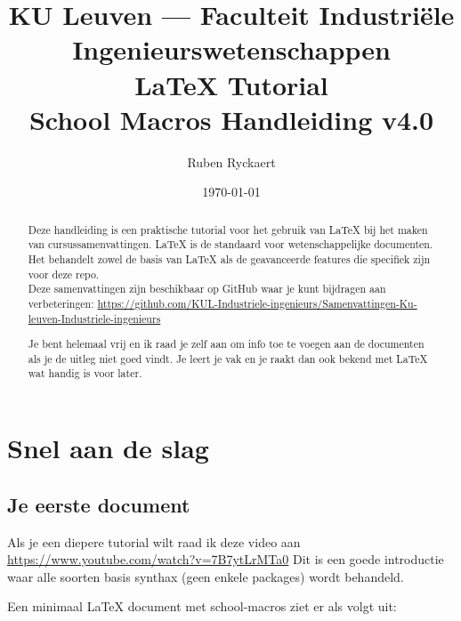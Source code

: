 \documentclass[a4paper,11pt]{article}
\title{%
    \vspace{-1cm}
    {\Large KU Leuven --- Faculteit Industriële Ingenieurswetenschappen}\\[0.5cm]
    {\Huge\bfseries LaTeX Tutorial}\\[0.3cm]
    {\Large School Macros Handleiding v4.0}
}
\author{Ruben Ryckaert}
\date{\today}
\begin{document}
\maketitle

\begin{abstract}
Deze handleiding is een praktische tutorial voor het gebruik van LaTeX bij het maken van
cursussamenvattingen. LaTeX is de standaard voor wetenschappelijke documenten.
Het behandelt zowel de basis van LaTeX als de geavanceerde features
die specifiek zijn voor deze repo.\\

Deze samenvattingen zijn beschikbaar op GitHub waar je kunt bijdragen aan verbeteringen: 
\url{https://github.com/KUL-Industriele-ingenieurs/Samenvattingen-Ku-leuven-Industriele-ingenieurs}

Je bent helemaal vrij en ik raad je zelf aan om info toe te voegen aan de documenten als je de uitleg niet goed vindt.
Je leert je vak en je raakt dan ook bekend met LaTeX wat handig is voor later.
\end{abstract}

\tableofcontents
\newpage


\section{Snel aan de slag}

\subsection{Je eerste document}

Als je een diepere tutorial wilt raad ik deze video aan \url{https://www.youtube.com/watch?v=7B7ytLrMTa0}
Dit is een goede introductie waar alle soorten basis synthax (geen enkele packages) wordt behandeld.

Een minimaal LaTeX document met school-macros ziet er als volgt uit:

\end{document}
